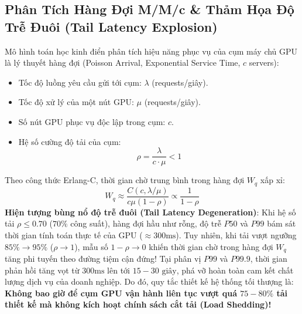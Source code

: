 \subsection{Phân Tích Hàng Đợi M/M/c \& Thảm Họa Độ Trễ Đuôi (Tail Latency Explosion)}
Mô hình toán học kinh điển phân tích hiệu năng phục vụ của cụm máy chủ GPU là lý thuyết hàng đợi  (Poisson Arrival, Exponential Service Time, $c$ servers):
\begin{itemize}
  \item Tốc độ luồng yêu cầu gửi tới cụm: $\lambda$ (requests/giây).
  \item Tốc độ xử lý của một nút GPU: $\mu$ (requests/giây).
  \item Số nút GPU phục vụ độc lập trong cụm: $c$.
  \item Hệ số cường độ tải của cụm:
  \begin{equation}
  \rho = \frac{\lambda}{c \cdot \mu} < 1
  \end{equation}
\end{itemize}
Theo công thức Erlang-C, thời gian chờ trung bình trong hàng đợi $W_q$ xấp xỉ:
\begin{equation}
W_q \approx \frac{C(c, \lambda/\mu)}{c\mu (1 - \rho)} \propto \frac{1}{1 - \rho}
\end{equation}
\textbf{Hiện tượng bùng nổ độ trễ đuôi (Tail Latency Degeneration)}:
Khi hệ số tải $\rho \le 0.70$ ($70\%$ công suất), hàng đợi hầu như rỗng, độ trễ $P50$ và $P99$ bám sát thời gian tính toán thực tế của GPU ($\approx 300\text{ms}$).
Tuy nhiên, khi tải vượt ngưỡng $85\% \to 95\%$ ($\rho \to 1$), mẫu số $1 - \rho \to 0$ khiến thời gian chờ trong hàng đợi $W_q$ tăng phi tuyến theo đường tiệm cận đứng!
Tại phân vị $P99$ và $P99.9$, thời gian phản hồi tăng vọt từ $300\text{ms}$ lên tới $15 - 30\text{ giây}$, phá vỡ hoàn toàn cam kết chất lượng dịch vụ của doanh nghiệp. Do đó, quy tắc thiết kế hệ thống tối thượng là: \textbf{Không bao giờ để cụm GPU vận hành liên tục vượt quá $75 - 80\%$ tải thiết kế mà không kích hoạt chính sách cắt tải (Load Shedding)!}

